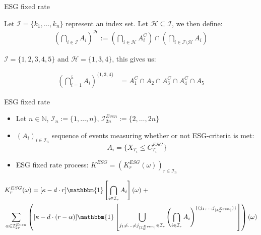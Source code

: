 \documentclass[UKenglish]{beamer}
\begin{document}
\begin{frame}{ESG fixed rate}
\begin{notation}
Let $\mathcal{I} = \{k_{1}, \dots, k_{n}\}$ represent an index set. Let $\mathcal{H} 
\subseteq \mathcal{I}$, we then define: 
\begin{align*}
\left(
\bigcap_{i\in \mathcal{I}}A_{i}
\right)^{\mathcal{H}}
:= 
\left(
\bigcap_{i\in \mathcal{H}}A_{i}^{C}
\right)
\cap 
\left(
\bigcap_{i \in \mathcal{I}\setminus \mathcal{H}}A_{i}
\right)
\end{align*}
\end{notation}

\begin{example}
$\mathcal{I} = \{1,2,3,4,5\}$ and $\mathcal{H} = \{1,3,4\}$, this gives us: 

\begin{align*}
\left(
\bigcap_{i=1}^{5}A_{i}
\right)^{
\{1,3,4\}
}
&= 
A_{1}^{C}\cap A_{2}\cap A_{3}^{C}\cap A_{4}^{C}\cap A_{5}
\end{align*}    
\end{example}
\end{frame}


\begin{frame}{ESG fixed rate}
\begin{itemize}
    \item Let $n\in \mathbb{N}$, $\mathcal{I}_{n} := \{1, \dots, n\}$, $\mathcal{I}_{2n}^{Even} := \{2, \dots, 2n\}$
    \item $(A_{i})_{i \in \mathcal{I}_{n}}$ sequence of events measuring whether or not ESG-criteria is met:
    \[
    A_{i} = \{X_{T_{i}} \leq C_{T_{i}}^{ESG}\}
    \]
    \item ESG fixed rate process: $K^{ESG} = (K_{r}^{ESG}(\omega))_{r\in \mathcal{I}_{n}}$ 
\end{itemize}

\begin{observation}
\begin{align*}
&K_{r}^{ESG}(\omega) = 
[\kappa -d\cdot r]\mathbbm{1}\left[
\bigcap_{i\in \mathcal{I}_{r}}A_{i}
\right](\omega)\; +\\ 
&\sum_{\alpha \in \mathcal{I}_{2r}^{Even}}
\left(
[\kappa -d\cdot (r-\alpha)]\mathbbm{1}\left[
\bigcup_{
j_{1}\neq \dots \neq j_{|\mathcal{I}_{\alpha}^{Even}|}
\in \mathcal{I}_{r}
}\left(
\bigcap_{i\in \mathcal{I}_{r}}A_{i}
\right)^{
\{
(j_{1}, \dots , j_{|\mathcal{I}_{\alpha}^{Even}|})
\}
}
\right]
\right)(\omega) 
\end{align*} 
\end{observation}
\end{frame}
\end{document}

